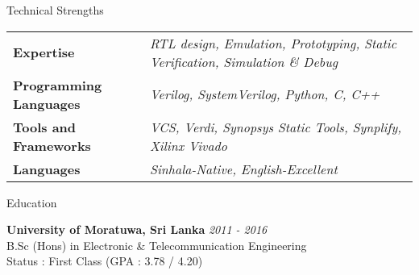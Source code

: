 \documentclass[
11pt, %
]{./assets/resume} %
\begin{document}
\begin{rSection}{Technical Strengths}
	
	\def\arraystretch{1.5}
	
	\begin{tabular}{p{2.0in} p{4.5in}}
		\textbf{Expertise} & \emph{RTL design, Emulation, Prototyping, Static Verification, Simulation \& Debug} \\
		\textbf{Programming Languages} & \emph{Verilog, SystemVerilog, Python, C, C++} \\
		\textbf{Tools and Frameworks} & \emph{VCS, Verdi, Synopsys Static Tools, Synplify, Xilinx Vivado} \\ 
		\textbf{Languages} & \emph{Sinhala-Native, English-Excellent} \\
	\end{tabular}
	
\end{rSection}


\begin{rSection}{Education}
	
	\textbf{University of Moratuwa, Sri Lanka} \hfill \textit{2011 - 2016} \\ 
	B.Sc (Hons) in Electronic \& Telecommunication Engineering \\
	Status : First Class (GPA : 3.78 / 4.20)
	
\end{rSection}

\end{document}
